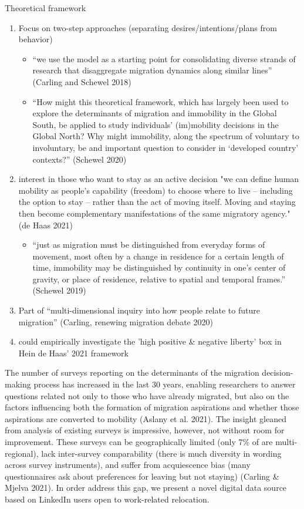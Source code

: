 Theoretical framework
\begin{enumerate}
    \item Focus on two-step approaches (separating desires/intentions/plans from behavior)
    \begin{itemize}
        \item “we use the model as a starting point for consolidating diverse strands of research that disaggregate migration dynamics along similar lines” (Carling and Schewel 2018)
        \item “How might this theoretical framework, which has largely been used to explore the determinants of migration and immobility in the Global South, be applied to study individuals’ (im)mobility decisions in the Global North? Why might immobility, along the spectrum of voluntary to involuntary, be and important question to consider in ‘developed country’ contexts?” (Schewel 2020)
    \end{itemize}
    \item interest in those who want to stay as an active decision "we can define human mobility as people’s capability (freedom) to choose where to live – including the option to stay – rather than the act of moving itself. Moving and staying then become complementary manifestations of the same migratory agency." (de Haas 2021)
    \begin{itemize}
        \item “just as migration must be distinguished from everyday forms of movement, most often by a change in residence for a certain length of time, immobility may be distinguished by continuity in one’s center of gravity, or place of residence, relative to spatial and temporal frames.” (Schewel 2019)
    \end{itemize}
    \item Part of “multi-dimensional inquiry into how people relate to future migration” (Carling, renewing migration debate 2020)
    \item could empirically investigate the 'high positive \& negative liberty' box in Hein de Haas' 2021 framework
\end{enumerate}
The number of surveys reporting on the determinants of the migration decision-making process has increased in the last 30 years, enabling researchers to answer questions related not only to those who have already migrated, but also on the factors influencing both the formation of migration aspirations and whether those aspirations are converted to mobility (Aslany et al. 2021). The insight gleaned from analysis of existing surveys is impressive, however, not without room for improvement. These surveys can be geographically limited (only 7\% of are multi-regional), lack inter-survey comparability (there is much diversity in wording across survey instruments), and suffer from acquiescence bias (many questionnaires ask about preferences for leaving but not staying) (Carling & Mjelva 2021). In order address this gap, we present a novel digital data source based on LinkedIn users open to work-related relocation.


